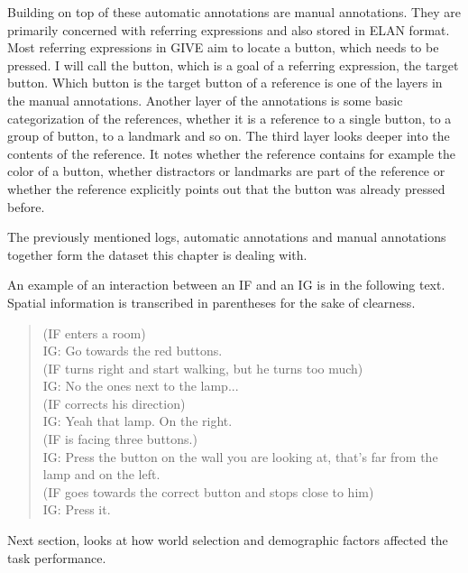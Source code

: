 Building on top of these automatic annotations are manual annotations. They are primarily concerned with referring expressions and also stored in ELAN format. Most referring expressions in GIVE aim to locate a button, which needs to be pressed. I will call the button, which is a goal of a referring expression, the target button. Which button is the target button of a reference is one of the layers in the manual annotations. Another layer of the annotations is some basic categorization of the references, whether it is a reference to a single button, to a group of button, to a landmark and so on. The third layer looks deeper into the contents of the reference. It notes whether the reference contains for example the color of a button, whether distractors or landmarks are part of the reference or whether the reference explicitly points out that the button was already pressed before.

The previously mentioned logs, automatic annotations and manual annotations together form the dataset this chapter is dealing with.

An example of an interaction between an IF and an IG is in the following text. Spatial information is transcribed in parentheses for the sake of clearness.

\begin{verse}
(IF enters a room)\\
IG: Go towards the red buttons.\\
(IF turns right and start walking, but he turns too much)\\
IG: No the ones next to the lamp...\\
(IF corrects his direction)\\
IG: Yeah that lamp. On the right.\\
(IF is facing three buttons.)\\
IG: Press the button on the wall you are looking at, that's far from the lamp and on the left. \\
(IF goes towards the correct button and stops close to him)\\
IG: Press it.\\
\end{verse}

Next section, looks at how world selection and demographic factors affected the task performance.

